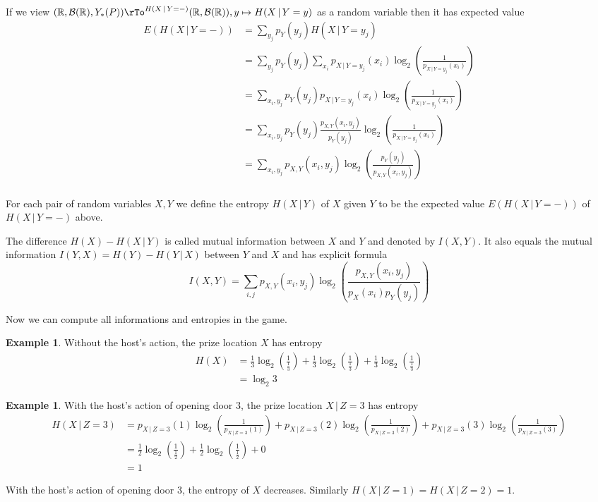 \documentclass[11pt]{amsart}
\theoremstyle{definition}
\newtheorem{example}[theorem]{Example}
\begin{document}
If we view $(\mathbb{R}, \mathcal{B}(\mathbb{R}), Y_*(P)) \rTo^{H(X \,|\, Y = -)} (\mathbb{R}, \mathcal{B}(\mathbb{R})), y \mapsto H(X \,|\, Y = y)$ as a random variable then it has expected value
\begin{align*}
E(H(X \,|\, Y = -)) & = \sum\limits_{y_j} p_Y(y_j) H(X \,|\, Y = y_j) \\
 & = \sum\limits_{y_j} p_Y(y_j) \sum\limits_{x_i} p_{X \,|\, Y = y_j}(x_i) \log_2 \left(\frac{1}{p_{X \,|\, Y = y_j}(x_i)} \right) \\
 & = \sum\limits_{x_i, y_j} p_Y(y_j) p_{X \,|\, Y = y_j}(x_i)  \log_2 \left( \frac{1}{p_{X \,|\, Y = y_j}(x_i)} \right) \\
 & = \sum\limits_{x_i, y_j} p_Y(y_j) \frac{p_{X,Y}(x_i, y_j)}{p_Y(y_j)} \log_2 \left( \frac{1}{p_{X \,|\, Y = y_j}(x_i)} \right) \\
 & = \sum\limits_{x_i, y_j} p_{X,Y}(x_i, y_j) \log_2 \left( \frac{p_Y(y_j)}{p_{X,Y}(x_i, y_j)} \right) \\
\end{align*}

\dfn\label{conditionalentropy} For each pair of random variables $X, Y$ we define the entropy $H(X \,|\, Y)$ of $X$ given $Y$ to be the expected value $E(H(X \,|\, Y = -))$ of $H(X \,|\, Y = -)$ above.

The difference $H(X) - H(X \,|\, Y)$ is called mutual information between $X$ and $Y$ and denoted by $I(X,Y)$. It also equals the mutual information $I(Y,X) = H(Y) - H(Y \,|\, X)$ between $Y$ and $X$ and has explicit formula
$$I(X,Y) = \sum\limits_{i,j} p_{X,Y}(x_i, y_j) \log_2 \left( \frac{p_{X,Y}(x_i, y_j)}{p_X(x_i)p_Y(y_j)} \right)$$

Now we can compute all informations and entropies in the game.
\begin{example}\label{} Without the host's action, the prize location $X$ has entropy
\begin{align*}
H(X) & = \frac{1}{3} \log_2 \left( \frac{1}{\frac{1}{3}} \right) + \frac{1}{3} \log_2 \left( \frac{1}{\frac{1}{3}} \right) + \frac{1}{3} \log_2  \left( \frac{1}{\frac{1}{3}} \right) \\
 & = \log_2 3
\end{align*}
\end{example}

\begin{example}\label{} With the host's action of opening door 3, the prize location $X \,|\, Z = 3$ has entropy
\begin{align*}
H(X \,|\, Z = 3) & = p_{X \,|\, Z = 3}(1)\log_2 \left(\frac{1}{p_{X \,|\, Z = 3}(1)} \right) + p_{X \,|\, Z = 3}(2)\log_2 \left(\frac{1}{p_{X \,|\, Z = 3}(2)} \right) + p_{X \,|\, Z = 3}(3) \log_2 \left( \frac{1}{p_{X \,|\, Z = 3}(3)} \right) \\
 & = \frac{1}{2} \log_2 \left( \frac{1}{\frac{1}{2}} \right) + \frac{1}{2} \log_2 \left( \frac{1}{\frac{1}{2}} \right) + 0 \\
 & = 1
\end{align*}

With the host's action of opening door 3, the entropy of $X$ decreases. Similarly $H(X \,|\, Z = 1) = H(X \,|\, Z = 2) = 1$.
\end{example}
\end{document}
